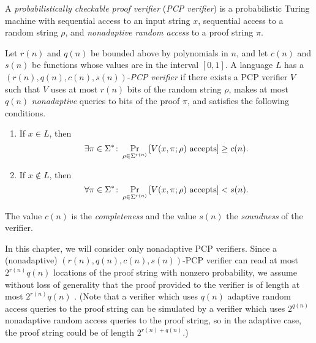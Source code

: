 \begin{definition}
  A \emph{probabilistically checkable proof verifier} (\emph{PCP verifier}) is a probabilistic Turing machine with sequential access to an input string $x$, sequential access to a random string $\rho$, and \emph{nonadaptive random access} to a proof string $\pi$.
\end{definition}

\begin{definition}
  Let $r(n)$ and $q(n)$ be bounded above by polynomials in $n$, and let $c(n)$ and $s(n)$ be functions whose values are in the interval $[0, 1]$.
  A language $L$ has a $(r(n), q(n), c(n), s(n))$-\emph{PCP verifier} if there exists a PCP verifier $V$ such that $V$ uses at most $r(n)$ bits of the random string $\rho$, makes at most $q(n)$ \emph{nonadaptive} queries to bits of the proof $\pi$, and satisfies the following conditions.
  \begin{enumerate}
  \item If $x \in L$, then
    \begin{equation*}
      \exists \pi \in \Sigma^* \colon \Pr_{\rho \in \Sigma^{r(n)}}{\left[V(x, \pi; \rho) \textnormal{ accepts}\right]} \geq c(n).
    \end{equation*}
  \item If $x \notin L$, then
    \begin{equation*}
      \forall \pi \in \Sigma^* \colon \Pr_{\rho \in \Sigma^{r(n)}}{\left[V(x, \pi; \rho) \textnormal{ accepts}\right]} < s(n).
    \end{equation*}
  \end{enumerate}
  The value $c(n)$ is the \emph{completeness} and the value $s(n)$ the \emph{soundness} of the verifier.
\end{definition}

In this chapter, we will consider only nonadaptive PCP verifiers.
Since a (nonadaptive) $(r(n), q(n), c(n), s(n))$-PCP verifier can read at most $2^{r(n)} q(n)$ locations of the proof string with nonzero probability, we assume without loss of generality that the proof provided to the verifier is of length at most $2^{r(n)} q(n)$ \autocite[Remark~11.6]{ab09}.
(Note that a verifier which uses $q(n)$ adaptive random access queries to the proof string can be simulated by a verifier which uses $2^{q(n)}$ nonadaptive random access queries to the proof string, so in the adaptive case, the proof string could be of length $2^{r(n) + q(n)}$.)

